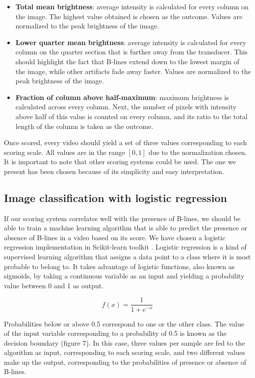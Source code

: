 \documentclass[11pt]{article} %
\begin{document}
\begin{itemize}
	\item \textbf{Total mean brightness}: average intensity is calculated for every column on the image. The highest value obtained is chosen as the outcome. Values are normalized to the peak brightness of the image.
	\item \textbf{Lower quarter mean brightness}: average intensity is calculated for every column on the quarter section that is further away from the transducer. This should highlight the fact that B-lines extend down to the lowest margin of the image, while other artifacts fade away faster. Values are normalized to the peak brightness of the image.
	\item \textbf{Fraction of column above half-maximum}: maximum brightness is calculated across every column. Next, the number of pixels with intensity above half of this value is counted on every column, and its ratio to the total length of the column is taken as the outcome. 
\end{itemize}

Once scored, every video should yield a set of three values corresponding to each scoring scale. All values are in the range $[0,1]$ due to the normalization chosen. It is important to note that other scoring systems could be used. The one we present has been chosen because of its simplicity and easy interpretation.

\subsection{Image classification with logistic regression}

	If our scoring system correlates well with the presence of B-lines, we should be able to train a machine learning algorithm that is able to predict the presence or absence of B-lines in a video based on its score. We have chosen a logistic regression implementation in Scikit-learn toolkit \cite{sklearn}. Logistic regression is a kind of supervised learning algorithm that assigns a data point to a class where it is most probable to belong to. It takes advantage of logistic functions, also known as sigmoids, by taking a continuous variable as an input and yielding a probability value between 0 and 1 as output. 

	\[ f(x) = \frac{1}{1+ e^{-x}} \]
	
	Probabilities below or above 0.5 correspond to one or the other class. The value of the input variable corresponding to a probability of 0.5 is known as the decision boundary (figure 7). In this case, three values per sample are fed to the algorithm as input, corresponding to each scoring scale, and two different values make up the output, corresponding to the probabilities of presence or absence of B-lines.
	
\end{document}
